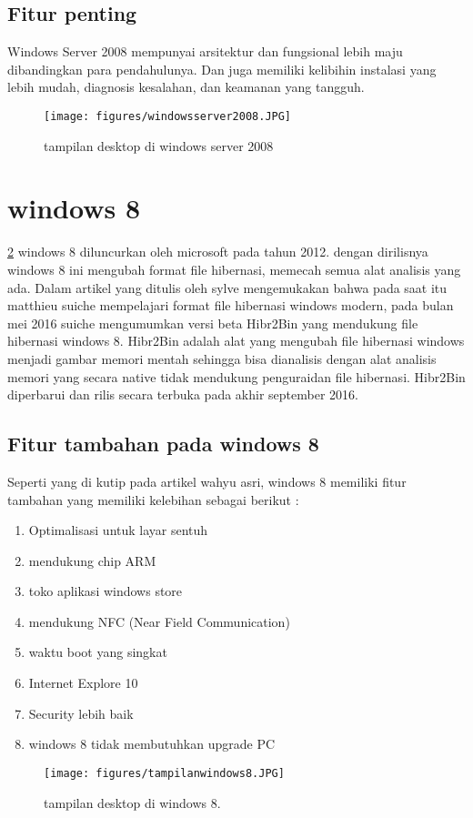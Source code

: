 \begin{enumerate}
	\subsection{Fitur penting}
	Windows Server 2008 mempunyai arsitektur dan fungsional lebih maju dibandingkan para pendahulunya. Dan juga memiliki kelibihin instalasi yang lebih mudah, diagnosis kesalahan, dan keamanan yang tangguh.

\begin{figure}[ht]
\centerline{\texttt{[image: figures/windowsserver2008.JPG]}}
\caption{tampilan desktop di windows server 2008}
\label{windowsserver2008}
\end{figure}
	\section{windows 8}
		\ref{tampilanwindows8} windows 8 diluncurkan oleh microsoft pada tahun 2012. dengan dirilisnya windows 8 ini mengubah format file hibernasi, memecah semua alat analisis yang ada.
		Dalam artikel yang ditulis oleh sylve mengemukakan bahwa pada saat itu matthieu suiche mempelajari format file hibernasi windows modern, pada bulan mei 2016 suiche mengumumkan versi beta Hibr2Bin yang mendukung file hibernasi windows 8. Hibr2Bin adalah alat yang mengubah file hibernasi windows menjadi gambar memori mentah sehingga bisa dianalisis dengan alat analisis memori yang secara native tidak mendukung penguraidan file hibernasi. Hibr2Bin diperbarui dan rilis secara terbuka pada akhir september 2016. \cite{sylve2017modern}
		\subsection{Fitur tambahan pada windows 8}
			Seperti yang di kutip pada artikel wahyu asri, windows 8 memiliki fitur tambahan yang memiliki kelebihan sebagai berikut :
\begin{enumerate}
			\item Optimalisasi untuk layar sentuh
			\item mendukung chip ARM
			\item toko aplikasi windows store
			\item mendukung NFC (Near Field Communication)
			\item waktu boot yang singkat
			\item Internet Explore 10
			\item Security lebih baik
			\item windows 8 tidak membutuhkan upgrade PC \cite{wahyu8review}
\end{enumerate}
\begin{figure}[ht]
\centerline{\texttt{[image: figures/tampilanwindows8.JPG]}}
\caption{tampilan desktop di windows 8.}
\label{tampilanwindows8}
\end{figure}



\end{enumerate}
